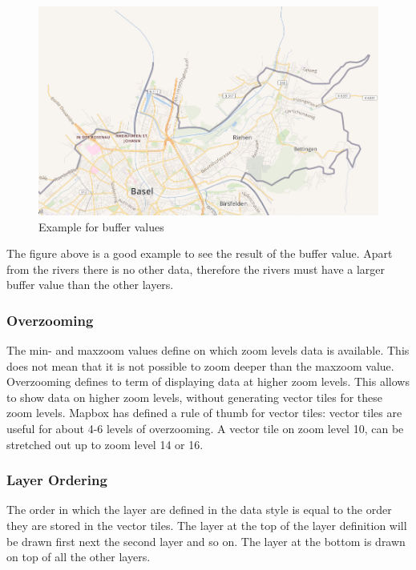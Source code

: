 \begin{figure}[H]
  \centering
  \includegraphics[width=1\textwidth]{images/buffer.png}
  \caption{Example for buffer values}
\end{figure}

The figure above is a good example to see the result of the buffer value. Apart from the rivers there is no other data, therefore the rivers must have a larger buffer value than the other layers.

\subsubsection{Overzooming}\label{overzooming}
The min- and maxzoom values define on which zoom levels data is available. This does not mean that it is not possible to zoom deeper than the maxzoom value.
Overzooming defines to term of displaying data at higher zoom levels\cite{90_mapbox.com_2015}.
This allows to show data on higher zoom levels, without generating vector tiles for these zoom levels.
Mapbox has defined a rule of thumb for vector tiles: vector tiles are useful for about 4-6 levels of overzooming. A vector tile on zoom level 10, can be stretched out up to zoom level 14 or 16.  

\subsubsection{Layer Ordering}\label{layer_ordering}
The order in which the layer are defined in the data style is equal to the order they are stored in the vector tiles.
The layer at the top of the layer definition will be drawn first next the second layer and so on. The layer at the bottom is drawn on top of all the other layers.


